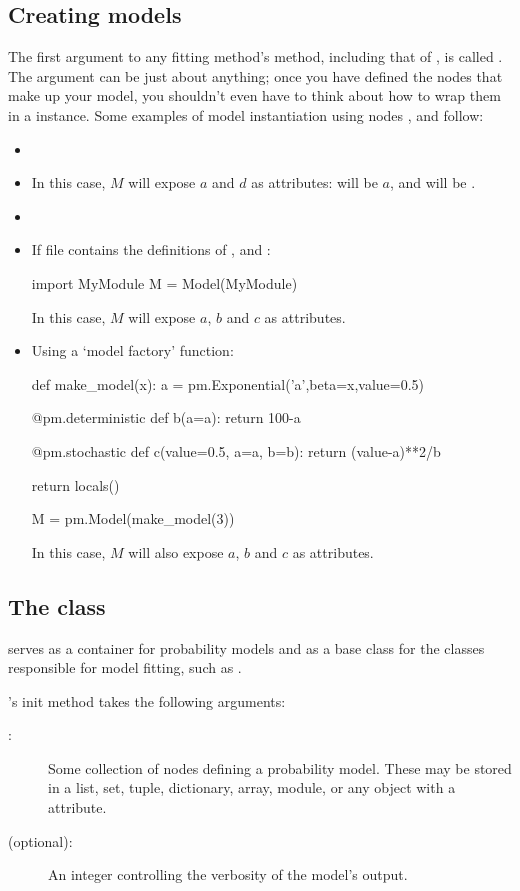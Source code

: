 \documentclass[]{jss}
\begin{document}
\subsection{Creating models} \label{sec:ModelInstantiation}
The first argument to any fitting method's  method, including that of , is called . The  argument can be just about anything; once you have defined the nodes that make up your model, you shouldn't even have to think about how to wrap them in a  instance. Some examples of model instantiation using nodes ,  and  follow:
\begin{itemize}
    \item {}
    \item {} In this case, $M$ will expose $a$ and $d$ as attributes:  will be $a$, and  will be \code{[b,c]}.
    \item {}
    \item If file  contains the definitions of ,  and :
   \begin{CodeInput}
import MyModule
M = Model(MyModule)
\end{CodeInput}
    In this case, $M$ will expose $a$, $b$ and $c$ as attributes.
    \item Using a `model factory' function:
    \begin{CodeInput}
def make_model(x):
a = pm.Exponential('a',beta=x,value=0.5)

@pm.deterministic
def b(a=a):
    return 100-a

@pm.stochastic
def c(value=0.5, a=a, b=b):
    return (value-a)**2/b

return locals()

M = pm.Model(make_model(3))
\end{CodeInput}
    In this case, $M$ will also expose $a$, $b$ and $c$ as attributes.
\end{itemize}

\subsection[The Model class]{The  class} \label{sec:Model}
 serves as a container for probability models and as a base class for the classes responsible for model fitting, such as .

's init method takes the following arguments:
\begin{description}
    \item[:] Some collection of  nodes defining a probability model. These may be stored in a list, set, tuple, dictionary, array, module, or any object with a  attribute.
    \item[ (optional):] An integer controlling the verbosity of the model's output.
\end{description}
\end{document}
